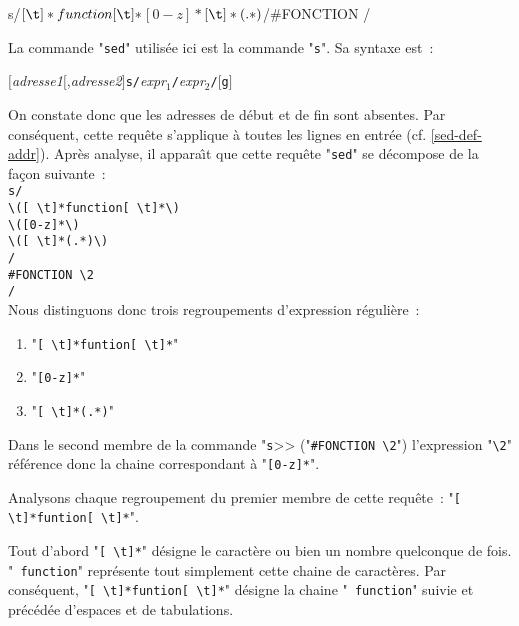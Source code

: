 \begin{example}
\begin{verbatim*}
s/\([ \t]*function[ \t]*\)\([0-z]*\)\([ \t]*(.*)\)/#FONCTION \2/
\end{verbatim*}

La commande "{\tt sed}" utilis{\'e}e ici est la commande "{\tt s}". Sa
syntaxe est~:
\begin{center}
$[${\sl adresse1}$[$,{\sl adresse2}$]${\tt s/}{\it expr$_1$}{\tt /}{\it expr$_2$}{\tt /}$[${\tt g}$]$
\end{center}

On constate donc que les adresses de d{\'e}but et de fin sont absentes. Par
cons{\'e}quent, cette requ{\^e}te s'applique {\`a} toutes les lignes en entr{\'e}e
(cf. \ref{sed-def-addr}). Apr{\`e}s analyse, il appara{\^\i}t que 
cette requ{\^e}te "{\tt sed}" se d{\'e}compose de la fa\c{c}on suivante~:\\[1ex]
{\tt s/}\\
\hspace{0.5cm}\verb*=\([ \t]*function[ \t]*\)=\\
\hspace{0.5cm}\verb*=\([0-z]*\)=\\
\hspace{0.5cm}\verb*=\([ \t]*(.*)\)=\\
{\tt /}\\
\hspace{0.5cm}\verb*=#FONCTION \2=\\
{\tt /}\\[1ex]
Nous distinguons donc trois regroupements d'expression r{\'e}guli{\`e}re~:
\begin{enumerate}
	\item	"\verb*=[ \t]*funtion[ \t]*="
	\item	"\verb=[0-z]*="
	\item	"\verb*=[ \t]*(.*)="
\end{enumerate}
Dans le second membre de la commande "{\tt s}>> ("\verb=#FONCTION \2=")
l'expression "\verb=\2=" r{\'e}f{\'e}rence donc la chaine correspondant {\`a}
"\verb=[0-z]*=".

Analysons chaque regroupement du premier membre de cette requ{\^e}te~:
"\verb*=[ \t]*funtion[ \t]*=".

Tout d'abord "\verb*=[ \t]*=" d{\'e}signe le caract{\`e}re
\spacekey ou bien \tabkey un nombre quelconque de fois. "{\tt
function}" repr{\'e}sente tout simplement cette chaine de caract{\`e}res. Par
cons{\'e}quent, "\verb*=[ \t]*funtion[ \t]*=" d{\'e}signe la chaine "{\tt
function}" suivie et pr{\'e}c{\'e}d{\'e}e d'espaces et de tabulations.


\end{example}

